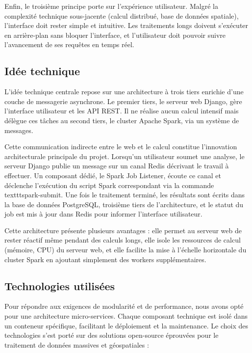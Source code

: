 \documentclass[french]{tai_info} %
\begin{document}
Enfin, le troisième principe porte sur l'expérience utilisateur. Malgré la complexité technique sous-jacente (calcul distribué, base de données spatiale), l'interface doit rester simple et intuitive. Les traitements longs doivent s'exécuter en arrière-plan sans bloquer l'interface, et l'utilisateur doit pouvoir suivre l'avancement de ses requêtes en temps réel.

\subsection{Idée technique}

L'idée technique centrale repose sur une architecture à trois tiers enrichie d'une couche de messagerie asynchrone. Le premier tiers, le serveur web Django, gère l'interface utilisateur et les API REST. Il ne réalise aucun calcul intensif mais délègue ces tâches au second tiers, le cluster Apache Spark, via un système de messages.

Cette communication indirecte entre le web et le calcul constitue l'innovation architecturale principale du projet. Lorsqu'un utilisateur soumet une analyse, le serveur Django publie un message sur un canal Redis décrivant le travail à effectuer. Un composant dédié, le Spark Job Listener, écoute ce canal et déclenche l'exécution du script Spark correspondant via la commande \\texttt{spark-submit}. Une fois le traitement terminé, les résultats sont écrits dans la base de données PostgreSQL, troisième tiers de l'architecture, et le statut du job est mis à jour dans Redis pour informer l'interface utilisateur.

Cette architecture présente plusieurs avantages : elle permet au serveur web de rester réactif même pendant des calculs longs, elle isole les ressources de calcul (mémoire, CPU) du serveur web, et elle facilite la mise à l'échelle horizontale du cluster Spark en ajoutant simplement des workers supplémentaires.

\subsection{Technologies utilisées}

Pour répondre aux exigences de modularité et de performance, nous avons opté pour une architecture micro-services. Chaque composant technique est isolé dans un conteneur spécifique, facilitant le déploiement et la maintenance. Le choix des technologies s'est porté sur des solutions open-source éprouvées pour le traitement de données massives et géospatiales :
\end{document}
